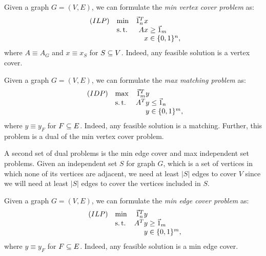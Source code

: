 \begin{defn}
    \label{def:min-vertex-cover-formulation}
    Given a graph $G=(V,E)$, we can formulate the \textit{min vertex cover problem} as:
        \begin{equation*}
        \begin{array}{llr@{}l@{}}
            (ILP)   & \min  &   \one_n^T x  &               \\
                    & \st   &       Ax      &{}\ge \one_m   \\
                    &       &       x       &{}\in \{0,1\}^n,
        \end{array}
        \end{equation*}
    where $A \equiv A_G$ and $x \equiv x_S$ for $S \subseteq V$. Indeed, any feasible solution is a vertex cover.
\end{defn}

\begin{defn}
    \label{def:max-matching-formulation}
    Given a graph $G=(V,E)$, we can formulate the \textit{max matching problem} as:
        \begin{equation*}
        \begin{array}{llr@{}l@{}}
            (IDP)   & \max  &   \one_m^T y  &               \\
                    & \st   &       A^T y   &{}\le \one_n   \\
                    &       &       y       &{}\in \{0,1\}^m,
        \end{array}
        \end{equation*}
    where $y \equiv y_F$ for $F \subseteq E$. Indeed, any feasible solution is a matching. Further, this problem is a dual of the min vertex cover problem.
\end{defn}

A second set of dual problems is the min edge cover and max independent set problems. Given an independent set $S$ for graph $G$, which is a set of vertices in which none of its vertices are adjacent, we need at least $|S|$ edges to cover $V$ since we will need at least $|S|$ edges to cover the vertices included in $S$.

\begin{defn}
    \label{def:min-edge-cover-formulation}
    Given a graph $G=(V,E)$, we can formulate the \textit{min edge cover problem} as:
        \begin{equation*}
        \begin{array}{llr@{}l@{}}
            (ILP)   & \min  &   \one_n^T y  &               \\
                    & \st   &       A^T y   &{}\ge \one_m   \\
                    &       &       y       &{}\in \{0,1\}^m,
        \end{array}
        \end{equation*}
    where $y \equiv y_F$ for $F \subseteq E$. Indeed, any feasible solution is a min edge cover.
\end{defn}

